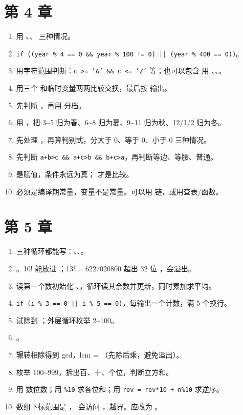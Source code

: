 \section{第 4 章}

\begin{enumerate}
  \item 用 、、 三种情况。
  \item \texttt{if ((year \% 4 == 0 \&\& year \% 100 != 0) || (year \% 400 == 0))}。
  \item 用字符范围判断：\texttt{c >= 'A' \&\& c <= 'Z'} 等；也可以包含  用 、、。
  \item 用三个  和临时变量两两比较交换，最后按  输出。
  \item 先判断 ，再用  分档。
  \item 用 ，把 3\textasciitilde5 归为春、6\textasciitilde8 归为夏、9\textasciitilde11 归为秋、12/1/2 归为冬。
  \item 先处理 ，再算判别式，分大于 0、等于 0、小于 0 三种情况。
  \item 先判断 \texttt{a+b>c \&\& a+c>b \&\& b+c>a}，再判断等边、等腰、普通。
  \item {} 是赋值，条件永远为真； 才是比较。
  \item {} 必须是编译期常量，变量不是常量。可以用  链，或用查表/函数。
\end{enumerate}

\section{第 5 章}

\begin{enumerate}
  \item 三种循环都能写：、、。
  \item {}。10! 能放进 ；13! = 6227020800 超出 32 位 ，会溢出。
  \item 读第一个数初始化 、，循环读其余数并更新，同时累加求平均。
  \item \texttt{if (i \% 3 == 0 || i \% 5 == 0)}，每输出一个计数，满 5 个换行。
  \item 试除到 ；外层循环枚举 2\textasciitilde100。
  \item {}。
  \item 辗转相除得到 gcd，lcm = （先除后乘，避免溢出）。
  \item 枚举 100\textasciitilde999，拆出百、十、个位，判断立方和。
  \item 用  数位数；用 \texttt{\%10} 求各位和；用 \texttt{rev = rev*10 + n\%10} 求逆序。
  \item 数组下标范围是 ， 会访问 ，越界。应改为 。
\end{enumerate}

